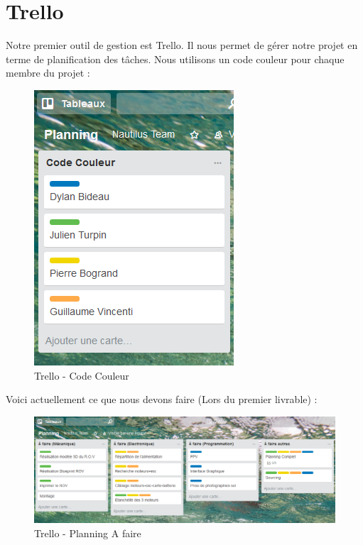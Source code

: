 \documentclass[a4paper,11pt]{report}
\begin{document}
        \section{Trello}
					Notre premier outil de gestion est Trello. Il nous permet de gérer notre projet en terme de planification des tâches. Nous utilisons un code couleur pour chaque membre du projet :
						\begin{figure}[!h]
							\begin{center}
								\includegraphics[scale=0.5]{Illustrations/Couleur.png}
								\caption{Trello - Code Couleur}
							\end{center}
						\end{figure}
						\newline Voici actuellement ce que nous devons faire (Lors du premier livrable) :
						\begin{figure}[!h]
							\begin{center}
								\includegraphics[scale=0.4]{Illustrations/Planning1.png}
								\caption{Trello - Planning A faire}
							\end{center}
						\end{figure}
\end{document}
